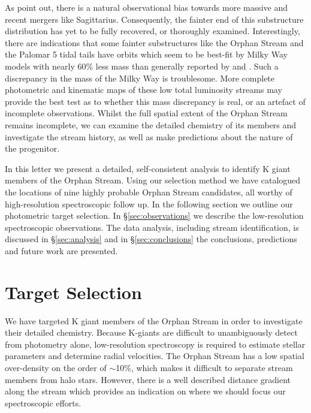 \documentclass[10pt,apjl]{emulateapj}
\begin{document}
As \citet{Sales_et-al_2008} point out, there is a natural observational bias towards more massive and recent mergers like Sagittarius. Consequently, the fainter end of this substructure distribution has yet to be fully recovered, or thoroughly examined. Interestingly, there are indications that  some fainter substructures like the Orphan Stream and the Palomar 5 tidal tails \citep{Odenkirchen_et-al_2009} have orbits which seem to be best-fit by Milky Way models with nearly 60\% less mass \citep{Newberg_et-al_2010} than generally reported by \citet{Xue_et-al_2008} and \citet{Koposov_et-al_2010}. Such a discrepancy in the mass of the Milky Way is troublesome. More complete photometric and kinematic maps of these low total luminosity streams may provide the best test as to whether this mass discrepancy is real, or an artefact of incomplete observations. Whilst the full spatial extent of the Orphan Stream remains incomplete, we can examine the detailed chemistry of its members and investigate the stream history, as well as make predictions about the nature of the progenitor.

In this letter we present a detailed, self-consistent analysis to identify K giant members of the Orphan Stream. Using our selection method we have catalogued the locations of nine highly probable Orphan Stream candidates, all worthy of high-resolution spectroscopic follow up. In the following section we outline our photometric target selection. In \S\ref{sec:observations} we describe the low-resolution spectroscopic observations. The data analysis, including stream identification, is discussed in \S\ref{sec:analysis} and in \S\ref{sec:conclusions} the conclusions, predictions and future work are presented.


\section{Target Selection}
\label{sec:target-selection}

We have targeted K giant members of the Orphan Stream in order to investigate their detailed chemistry. Because K-giants are difficult to unambiguously detect from photometry alone, low-resolution spectroscopy is required to estimate stellar parameters and determine radial velocities. The Orphan Stream has a low spatial over-density on the order of $\sim$10\%, which makes it difficult to separate stream members from halo stars. However, there is a well described distance gradient along the stream \citep{Belokurov_et-al_2007, Newberg_et-al_2010} which provides an indication on where we should focus our spectroscopic efforts.
\end{document}
